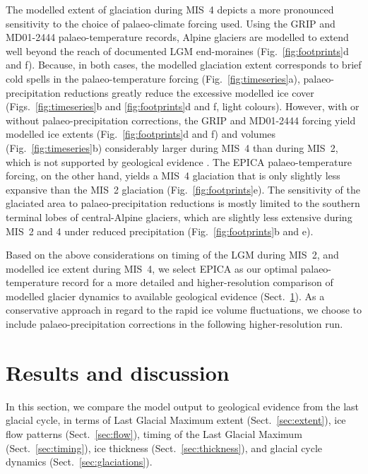 \documentclass[tc, manuscript]{copernicus}
\begin{document}
    The modelled extent of glaciation during MIS~4 depicts a more pronounced
    sensitivity to the choice of palaeo-climate forcing used. Using the GRIP
    and MD01-2444 palaeo-temperature records, Alpine glaciers are modelled to
    extend well beyond the reach of documented LGM end-moraines
    (Fig.~\ref{fig:footprints}d and f). Because, in both cases,
    the modelled glaciation extent corresponds to brief cold spells in the
    palaeo-temperature forcing (Fig.~\ref{fig:timeseries}a),
    palaeo-precipitation reductions greatly reduce the excessive modelled ice
    cover (Figs.~\ref{fig:timeseries}b and \ref{fig:footprints}d and f, light
    colours). However, with or without palaeo-precipitation corrections,
    the GRIP and MD01-2444 forcing yield
    modelled ice extents (Fig.~\ref{fig:footprints}d and f) and volumes
    (Fig.~\ref{fig:timeseries}b) considerably larger during MIS~4 than
    during MIS~2, which is not supported by geological evidence
    \citep{Preusser.2004, Ivy-Ochs.etal.2008}.
    The EPICA palaeo-temperature forcing, on the other hand, yields a MIS~4
    glaciation that is only slightly less expansive than the MIS~2 glaciation
    (Fig.~\ref{fig:footprints}e). The sensitivity of the glaciated area to
    palaeo-precipitation reductions is mostly limited to the southern terminal
    lobes of central-Alpine glaciers, which are slightly less extensive during
    MIS~2 and 4 under reduced precipitation (Fig.~\ref{fig:footprints}b and e).

    Based on the above considerations on timing of the LGM during MIS~2, and
    modelled ice
    extent during MIS~4, we select EPICA as our optimal palaeo-temperature
    record for a more detailed and higher-resolution comparison of modelled
    glacier dynamics to available geological evidence
    (Sect.~\ref{sec:results}). As a conservative approach in regard to the
    rapid ice volume fluctuations, we choose to include palaeo-precipitation
    corrections in the following higher-resolution run.


\section{Results and discussion}
\label{sec:results}

    In this section, we compare the model output to geological evidence from
    the last glacial cycle, in terms of Last Glacial Maximum extent
    (Sect.~\ref{sec:extent}), ice flow patterns
    (Sect.~\ref{sec:flow}), timing of the Last Glacial Maximum
    (Sect.~\ref{sec:timing}), ice thickness (Sect.~\ref{sec:thickness}), and
    glacial cycle dynamics (Sect.~\ref{sec:glaciations}).
\end{document}
